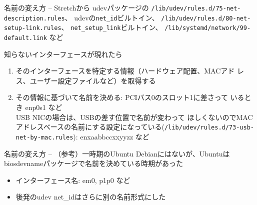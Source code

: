\begin{frame}{名前の変え方 -- Stretchから}
 udevパッケージの
 {\footnotesize{\texttt{/lib/udev/rules.d/75-net-description.rules}}}、
 udevの{\footnotesize{\texttt{net\_id}}}ビルトイン、
 {\footnotesize{\texttt{/lib/udev/rules.d/80-net-setup-link.rules}}}、
 {\footnotesize{\texttt{net\_setup\_link}}}ビルトイン、
 {\footnotesize{\texttt{/lib/systemd/network/99-default.link}}} など

 \pause
 知らないインターフェースが現れたら
 \pause

 \begin{enumerate}[<+->]
  \item そのインターフェースを特定する情報（ハードウェア配置、MACアド
	レス、ユーザー設定ファイルなど）を取得する
  \item その情報に基づいて名前を決める: PCIバス0のスロット1に差さって
	いるとき enp0s1 など\\ \pause
	USB NICの場合は、USBの差す位置で名前が変わって
	ほしくないのでMACアドレスベースの名前にする設定になっている({\footnotesize{\texttt{/lib/udev/rules.d/73-usb-net-by-mac.rules}}}): enxaabbccxxyyzz など
 \end{enumerate}
\end{frame}

\begin{frame}{名前の変え方 -- （参考）一時期のUbuntu}
 Debianにはないが、Ubuntuはbiosdevnameパッケージで名前を決めている時期があった

 \begin{itemize}[<+->]
  \item インターフェース名: em0, p1p0 など
  \item 後発のudev net\_idはさらに別の名前形式にした
 \end{itemize}
\end{frame}

